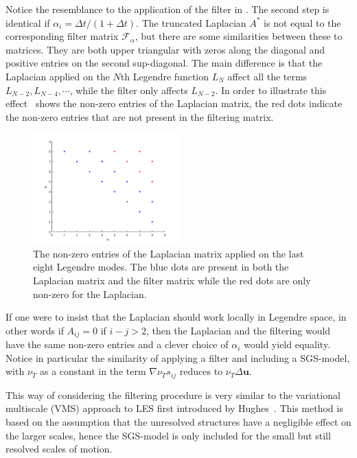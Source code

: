 Notice the resemblance to the application of the filter in . The second step
is identical if $\alpha_i = \Delta t/(1+\Delta t)$. The truncated Laplacian $A^*$ is not equal to the corresponding
filter matrix $\mathcal{F}_{\alpha}$, but there are some similarities between these to matrices.
They are both upper triangular with zeros along the diagonal and positive entries on the second 
sup-diagonal. The main difference is that the Laplacian applied on the $N$th Legendre function 
$L_N$ affect all the terms $L_{N-2},L_{N-4},\cdots$, while the filter only affects $L_{N-2}$.
In order to illustrate this effect~ shows the non-zero entries of the
Laplacian matrix, the red dots indicate the non-zero entries that are not present in the filtering
matrix.
%
\begin{figure}[h]
	\centering
	\includegraphics[width=0.5\textwidth]{Figures/matrix.png}
	\caption{The non-zero entries of the Laplacian matrix applied on the last eight Legendre modes.
    The blue dots are present in both the Laplacian matrix and the filter matrix
    while the red dots are only non-zero for the Laplacian.}
	\label{fig:entries}
\end{figure}
%
If one were to insist that the Laplacian should work locally in Legendre space, in other words 
if $A_{ij}=0$ if $i-j>2$, then the Laplacian and the filtering would have the same non-zero entries 
and a clever choice of $\alpha_i$ would yield equality. Notice in particular the similarity of 
applying a filter and including a SGS-model, with $\nu_T$ as a constant in  the term 
$\nabla \nu_Ts_{ij}$ reduces to $\nu_T\Delta \mathbf{u}$.

This way of considering the filtering procedure is very similar to the variational multiscale (VMS) 
approach to LES first introduced by Hughes~\cite{Hughes}. This method is based on the assumption that
the unresolved structures have a negligible effect on the larger scales, hence the SGS-model is 
only included for the small but still resolved scales of motion.


